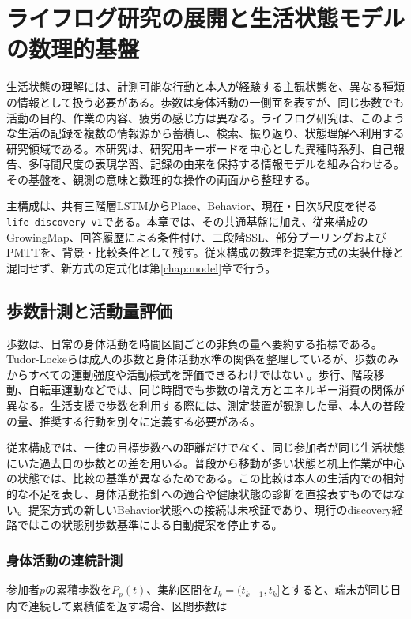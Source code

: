 \chapter{ライフログ研究の展開と生活状態モデルの数理的基盤}
\label{chap:related-work}

生活状態の理解には、計測可能な行動と本人が経験する主観状態を、異なる種類の情報として扱う必要がある。歩数は身体活動の一側面を表すが、同じ歩数でも活動の目的、作業の内容、疲労の感じ方は異なる。ライフログ研究は、このような生活の記録を複数の情報源から蓄積し、検索、振り返り、状態理解へ利用する研究領域である。本研究は、研究用キーボードを中心とした異種時系列、自己報告、多時間尺度の表現学習、記録の由来を保持する情報モデルを組み合わせる。その基盤を、観測の意味と数理的な操作の両面から整理する。

主構成は、共有三階層LSTMからPlace、Behavior、現在・日次5尺度を得る\texttt{life-discovery-v1}である。本章では、その共通基盤に加え、従来構成のGrowingMap、回答履歴による条件付け、二段階SSL、部分プーリングおよびPMTTを、背景・比較条件として残す。従来構成の数理を提案方式の実装仕様と混同せず、新方式の定式化は第\ref{chap:model}章で行う。

\section{歩数計測と活動量評価}

歩数は、日常の身体活動を時間区間ごとの非負の量へ要約する指標である。Tudor-Lockeらは成人の歩数と身体活動水準の関係を整理しているが、歩数のみからすべての運動強度や活動様式を評価できるわけではない \autocite{tudorlocke2011steps}。歩行、階段移動、自転車運動などでは、同じ時間でも歩数の増え方とエネルギー消費の関係が異なる。生活支援で歩数を利用する際には、測定装置が観測した量、本人の普段の量、推奨する行動を別々に定義する必要がある。

従来構成では、一律の目標歩数への距離だけでなく、同じ参加者が同じ生活状態にいた過去日の歩数との差を用いる。普段から移動が多い状態と机上作業が中心の状態では、比較の基準が異なるためである。この比較は本人の生活内での相対的な不足を表し、身体活動指針への適合や健康状態の診断を直接表すものではない。提案方式の新しいBehavior状態への接続は未検証であり、現行のdiscovery経路ではこの状態別歩数基準による自動提案を停止する。

\subsection{身体活動の連続計測}

参加者\(p\)の累積歩数を\(P_p(t)\)、集約区間を\(I_k=(t_{k-1},t_k]\)とすると、端末が同じ日内で連続して累積値を返す場合、区間歩数は


